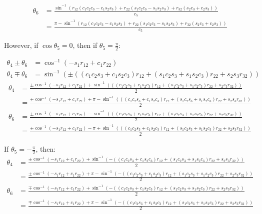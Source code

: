 \documentclass{article}
\begin{document}
\begin{align*}
\theta_6 & = \frac{\sin^{-1} \left(
		r_{12} ( c_1 c_2 c_3 - c_1 s_2 s_3 ) + r_{22} (s_1 c_2 c_3 - s_1 s_2 s_3)
			+ r_{32} ( s_2 c_3 + c_2 s_3 ) \right) }{c_5}\\
 & = \frac{\pi - \sin^{-1} \left(
		r_{12} ( c_1 c_2 c_3 - c_1 s_2 s_3 ) + r_{22} (s_1 c_2 c_3 - s_1 s_2 s_3)
			+ r_{32} ( s_2 c_3 + c_2 s_3 ) \right) }{c_5}
\end{align*}

However, if $\cos \theta_5 = 0$, then if $\theta_5 = \frac{\pi}2$:

\begin{align*}
\theta_4 \pm \theta_6 & =
	\cos^{-1} \left( - s_1 r_{12} + c_1 r_{22} \right) \\
\theta_4 \mp \theta_6 & =
	\sin^{-1} \left( \pm \left( (c_1 c_2 s_3 + c_1 s_2 c_3) r_{12}
			+ (s_1 c_2 s_3 + s_1 s_2 c_3) r_{22} + s_2 s_3 r_{32} \right) \right)
\end{align*}
\begin{align*}
\theta_4 & = \frac{ \pm \cos^{-1} \left( - s_1 r_{12} + c_1 r_{22} \right)
		+ \sin^{-1} \left( \left( (c_1 c_2 s_3 + c_1 s_2 c_3) r_{12}
			+ (s_1 c_2 s_3 + s_1 s_2 c_3) r_{22} + s_2 s_3 r_{32} \right) \right)}2\\
& = \frac{ \pm \cos^{-1} \left( - s_1 r_{12} + c_1 r_{22} \right)
		+ \pi -  \sin^{-1} \left( \left( (c_1 c_2 s_3 + c_1 s_2 c_3) r_{12}
			+ (s_1 c_2 s_3 + s_1 s_2 c_3) r_{22} + s_2 s_3 r_{32} \right) \right)}2\\
\theta_6 & = \frac{ \pm \cos^{-1} \left( - s_1 r_{12} + c_1 r_{22} \right)
		- \sin^{-1} \left( \left( (c_1 c_2 s_3 + c_1 s_2 c_3) r_{12}
			+ (s_1 c_2 s_3 + s_1 s_2 c_3) r_{22} + s_2 s_3 r_{32} \right) \right)}2\\
& = \frac{ \pm \cos^{-1} \left( - s_1 r_{12} + c_1 r_{22} \right)
		- \pi +  \sin^{-1} \left( \left( (c_1 c_2 s_3 + c_1 s_2 c_3) r_{12}
			+ (s_1 c_2 s_3 + s_1 s_2 c_3) r_{22} + s_2 s_3 r_{32} \right) \right)}2
\end{align*}

If $\theta_5 = - \frac{\pi}{2}$, then:
\begin{align*}
\theta_4 & = \frac{ \pm \cos^{-1} \left( - s_1 r_{12} + c_1 r_{22} \right)
		+ \sin^{-1} \left( - \left( (c_1 c_2 s_3 + c_1 s_2 c_3) r_{12}
			+ (s_1 c_2 s_3 + s_1 s_2 c_3) r_{22} + s_2 s_3 r_{32} \right) \right)}2\\
& = \frac{ \pm \cos^{-1} \left( - s_1 r_{12} + c_1 r_{22} \right)
		+ \pi -  \sin^{-1} \left( - \left( (c_1 c_2 s_3 + c_1 s_2 c_3) r_{12}
			+ (s_1 c_2 s_3 + s_1 s_2 c_3) r_{22} + s_2 s_3 r_{32} \right) \right)}2\\
\theta_6 & = \frac{ \mp \cos^{-1} \left( - s_1 r_{12} + c_1 r_{22} \right)
		+ \sin^{-1} \left( - \left( (c_1 c_2 s_3 + c_1 s_2 c_3) r_{12}
			+ (s_1 c_2 s_3 + s_1 s_2 c_3) r_{22} + s_2 s_3 r_{32} \right) \right)}2\\
& = \frac{ \mp \cos^{-1} \left( - s_1 r_{12} + c_1 r_{22} \right)
		+ \pi -  \sin^{-1} \left( - \left( (c_1 c_2 s_3 + c_1 s_2 c_3) r_{12}
			+ (s_1 c_2 s_3 + s_1 s_2 c_3) r_{22} + s_2 s_3 r_{32} \right) \right)}2
\end{align*}
\end{document}
